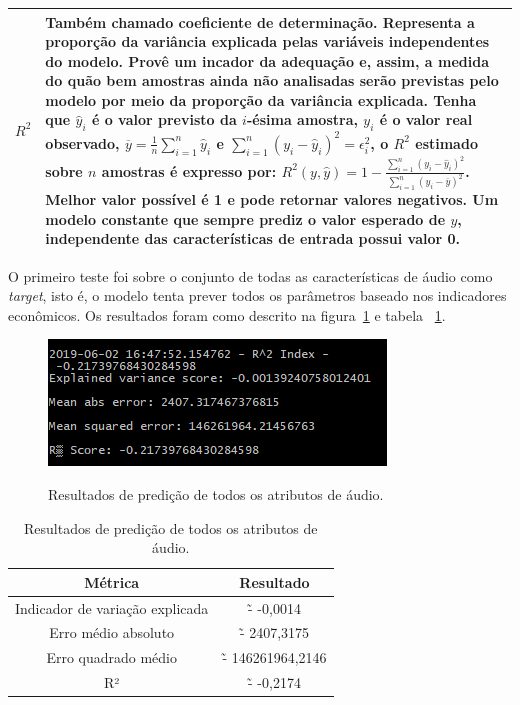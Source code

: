 \begin{tabularx}{\linewidth}{c|X}
	{$R^2$} & {Também chamado coeficiente de determinação. Representa a proporção da variância explicada pelas variáveis independentes do modelo. Provê um incador da adequação e, assim, a medida do quão bem amostras ainda não analisadas serão previstas pelo modelo por meio da proporção da variância explicada. Tenha que $\widehat{y}_i$ é o valor previsto da $i$-ésima amostra, $y_i$ é o valor real observado, $\overline{y} = \frac{1}{n} \sum_{i=1}^{n}\widehat{y}_i$ e $\sum_{i=1}^{n} (y_i-\widehat{y}_i)^2 =  \epsilon_i^2$, o $R^2$ estimado sobre $n$ amostras é expresso por: $R^2(y,\widehat{y}) = 1 - \frac{\sum_{i=1}^{n} (y_i-\widehat{y}_i)^2}{\sum_{i=1}^{n} (y_i-\overline{y})^2}$. Melhor valor possível é 1 e pode retornar valores negativos. Um modelo constante que sempre prediz o valor esperado de $y$, independente das características de entrada possui valor 0.}\\\hline
	\bottomrule
\end{tabularx}

O primeiro teste foi sobre o conjunto de todas as características de áudio como \textit{target}, isto é, o modelo tenta prever todos os parâmetros baseado nos indicadores econômicos. Os resultados foram como descrito na figura~\ref{f.params_all_audio_features} e tabela ~\ref{t.params_all_audio_features}.

\begin{figure}[H]
	\caption{Resultados de predição de todos os atributos de áudio.}
	\centering
	\includegraphics[width=\textwidth,height=\textheight,keepaspectratio]{../figs/params_all_audio_features.PNG}
	\label{f.params_all_audio_features}
\end{figure}

\begin{table}[H]
	\centering
	\caption{Resultados de predição de todos os atributos de áudio.}\label{t.params_all_audio_features}
	\begin{tabular}{c|c}
		\hline
		\textbf{Métrica} & \textbf{Resultado}\\\hline \hline
		{Indicador de variação explicada} & {\~- -0,0014}\\\hline
		{Erro médio absoluto} & {\~- 2407,3175}\\\hline
		{Erro quadrado médio} & {\~- 146261964,2146}\\\hline
		{R²} & {\~- -0,2174}\\\hline
	\end{tabular}
\end{table}

